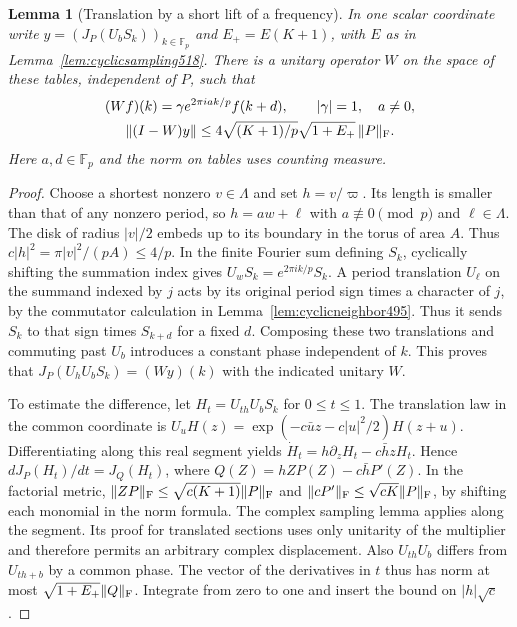 \documentclass[a4paper,11pt]{article}
\newtheorem{lemma}[proposition]{Lemma}
\theoremstyle{definition}
\theoremstyle{remark}
\numberwithin{equation}{section}
\begin{document}
\begin{lemma}[Translation by a short lift of a frequency]\leavevmode
\label{lem:shortmotion519}
In one scalar coordinate write \(y=(J_P(U_bS_k))_{k\in\mathbb F_p}\)
and \(E_+=E(K+1)\), with \(E\) as in Lemma~\ref{lem:cyclicsampling518}.
There is a unitary operator \(W\) on the space of these tables,
independent of \(P\), such that
\[
 \begin{gathered}
 (Wf)(k)=\gamma e^{2\pi i a k/p}f(k+d),\qquad |\gamma|=1,
 \quad a\ne0,\\
 \|(I-W)y\|\le 4\sqrt{(K+1)/p}\sqrt{1+E_+}\,\|P\|_{\rm F}.
 \end{gathered}
\]
Here \(a,d\in\mathbb F_p\) and the norm on tables uses counting measure.
\end{lemma}
\begin{proof}
Choose a shortest nonzero \(v\in\Lambda\) and set \(h=v/\varpi\).
Its length is smaller than that of any nonzero period, so
\(h=aw+\ell\) with \(a\not\equiv0\pmod p\) and \(\ell\in\Lambda\).
The disk of radius \(|v|/2\) embeds up to its boundary in the
torus of area \(A\). Thus \(c|h|^2=\pi|v|^2/(pA)\le4/p\).
In the finite Fourier sum defining \(S_k\), cyclically shifting the
summation index gives \(U_w S_k=e^{2\pi i k/p} S_k\). A period
translation \(U_\ell\) on the summand indexed by \(j\) acts by its
original period sign times a character of \(j\), by the commutator
calculation in Lemma~\ref{lem:cyclicneighbor495}. Thus it sends
\(S_k\) to that sign times \(S_{k+d}\) for a fixed \(d\). Composing
these two translations and commuting past \(U_b\) introduces a
constant phase independent of \(k\). This proves that
\(J_P(U_hU_b S_k)=(Wy)(k)\) with the indicated unitary \(W\).

To estimate the difference, let \(H_t=U_{th}U_bS_k\) for
\(0\le t\le1\). The translation law in the common coordinate is
\(U_uH(z)=\exp(-c\bar u z-c|u|^2/2)H(z+u)\). Differentiating
along this real segment yields
\(\dot H_t=h\partial_z H_t-c\bar h z H_t\). Hence
\(d J_P(H_t)/dt=J_Q(H_t)\), where
\(Q(Z)=hZP(Z)-c\bar h P'(Z)\). In the factorial metric,
\(\|ZP\|_{\rm F}\le\sqrt{c(K+1)}\|P\|_{\rm F}\) and
\(\|cP'\|_{\rm F}\le\sqrt{cK}\|P\|_{\rm F}\), by shifting each
monomial in the norm formula. The complex sampling lemma applies
along the segment. Its proof for translated sections uses only
unitarity of the multiplier and therefore permits an arbitrary
complex displacement. Also \(U_{th}U_b\) differs from \(U_{th+b}\)
by a common phase. The vector of the derivatives in \(t\) thus
has norm at most \(\sqrt{1+E_+}\|Q\|_{\rm F}\). Integrate from
zero to one and insert the bound on \(|h|\sqrt c\).
\end{proof}
\end{document}
